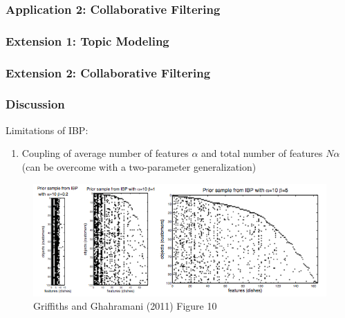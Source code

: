 \documentclass[13pt]{beamer}
\begin{document}
\begin{frame}
\frametitle{Application 2: Collaborative Filtering}
\end{frame}
\begin{frame}
\frametitle{Extension 1: Topic Modeling}
\end{frame}
\begin{frame}
\frametitle{Extension 2: Collaborative Filtering}
\end{frame}
\begin{frame}
\frametitle{Discussion}


Limitations of IBP:
\begin{enumerate}
\item Coupling of average number of features $\alpha$ and total number of features $N\alpha$ (can be overcome with a two-parameter generalization)
\end{enumerate}

\begin{figure}
\begin{center}
\includegraphics[scale=0.5]{./img/two-parameter-ibp.png}
\caption{Griffiths and Ghahramani (2011) Figure 10}
\end{center}
\end{figure}

\end{frame}
 
\end{document}
